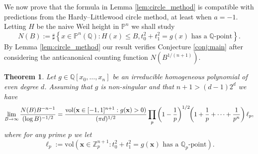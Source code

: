 \documentclass[a4paper,12pt,reqno]{amsart}
\numberwithin{equation}{section} \numberwithin{figure}{section}
\DeclareMathOperator{\vol}{vol} \DeclareMathOperator{\spn}{span}
\newcommand{\x}{\mathbf{x}}
\renewcommand\P{\mathbb{P}}
\newcommand\Z{\mathbb{Z}}
\newcommand\Q{\mathbb{Q}}
\renewcommand{\l}{\left}
\renewcommand{\r}{\right}
\renewcommand{\b}{\mathbf}
\renewcommand{\leq}{\leqslant}
\renewcommand{\#}{\sharp}
\newtheorem{theorem}[lemma]{Theorem}
\theoremstyle{definition}
\numberwithin{lemma}{section}
\begin{document}
We now prove that the formula in Lemma \ref{lem:circle_method} is compatible with predictions from the Hardy--Littlewood circle method, at least when $a = -1$.   Letting   $H$ be the naive Weil height in $\P^{n}$
we shall study
\[N(B):=\#\left\{x\in \P^{n}(\Q): H(x) \leq B, t_0^2+t_1^2=g( x ) \text{ has a } \Q\text{-point}\right\}.\]
By Lemma \ref{lem:circle_method} our result verifies Conjecture \ref{conj:main} after considering the anticanonical counting function $N(B^{1/(n+1)})$.
\begin{theorem}
 \label{thm:birchcircle} 
Let $g \in \Q[x_0,\dots,x_n]$ be an irreducible homogeneous polynomial of even degree $d$.
Assuming that  $g$ is non-singular and that $n+1>(d-1) 2^d$
we have 
$$ \lim_{B\to\infty}
\frac{N(B)B^{-n-1} }{(\log B)^{-1/2} }
=
 \frac{ \vol( \x \in [-1,1]^{n+1}  :g(\x )> 0)}{(\pi d)^{1/2}} 
\prod_{p }  \l(1-\frac{1}{p}\r)^{1/2} 
\hspace{-0,1cm}
\l(1+\frac{1}{p}+\cdots+\frac{1}{p^n} \r) \ell_p
,$$
where for any prime $p$ we let $$\ell_p :=\mathrm{vol}\l(\b x  \in \Z_p^{n+1}:  t_0^2+t_1^2=g( \b x ) \text{ has a } \Q_p\text{-point}\r).$$ 
\end{theorem}
\end{document}
